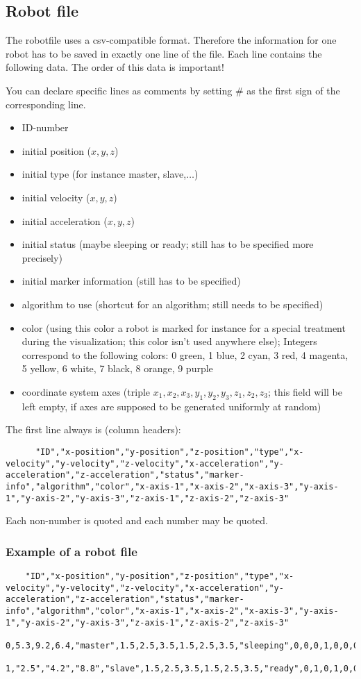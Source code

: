 \subsection{Robot file}
The robotfile uses a csv-compatible format.
Therefore the information for one robot has to be saved in exactly one line of the file.
Each line contains the following data. The order of this data is important!

You can declare specific lines as comments by setting \# as the first sign of
the corresponding line.
\begin{itemize}
	\item ID-number
	\item initial position ($x,y,z$)
	\item initial type (for instance master, slave,$\ldots$)
	\item initial velocity ($x,y,z$)
	\item initial acceleration ($x,y,z$)
	\item initial status (maybe sleeping or ready; still has to be specified more precisely)
	\item initial marker information (still has to be specified)
	\item algorithm to use (shortcut for an algorithm; still needs to be specified)
	\item color (using this color a robot is marked for instance for a special treatment during the visualization; this color isn't used anywhere else); Integers correspond to the following colors: 0 green, 1 blue, 2 cyan, 3 red, 4 magenta, 5 yellow, 6 white, 7 black, 8 orange, 9 purple
	\item coordinate system axes (triple $x_1,x_2,x_3,y_1,y_2,y_3,z_1,z_2,z_3$; this field will be left empty, if axes are supposed to be generated uniformly at random)
\end{itemize}
The first line always is (column headers):
\begin{lstlisting}
	  "ID","x-position","y-position","z-position","type","x-velocity","y-velocity","z-velocity","x-acceleration","y-acceleration","z-acceleration","status","marker-info","algorithm","color","x-axis-1","x-axis-2","x-axis-3","y-axis-1","y-axis-2","y-axis-3","z-axis-1","z-axis-2","z-axis-3"
\end{lstlisting}
Each non-number is quoted and each number may be quoted.

\subsubsection{Example of a robot file}
\begin{lstlisting}
	"ID","x-position","y-position","z-position","type","x-velocity","y-velocity","z-velocity","x-acceleration","y-acceleration","z-acceleration","status","marker-info","algorithm","color","x-axis-1","x-axis-2","x-axis-3","y-axis-1","y-axis-2","y-axis-3","z-axis-1","z-axis-2","z-axis-3"
	0,5.3,9.2,6.4,"master",1.5,2.5,3.5,1.5,2.5,3.5,"sleeping",0,0,0,1,0,0,0,1,0,0,0,1
	1,"2.5","4.2","8.8","slave",1.5,2.5,3.5,1.5,2.5,3.5,"ready",0,1,0,1,0,0,0,1,0,0,0,1
\end{lstlisting}

